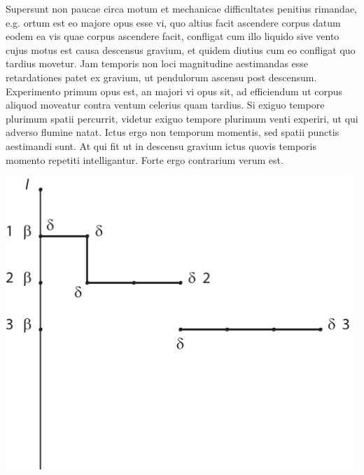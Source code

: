 \pend
\pstart
\noindent
Supersunt non paucae circa motum et mechanicae difficultates penitius rimandae,
e.g. ortum est eo majore opus esse vi\protect{},
quo altius facit ascendere corpus datum eodem
ea vis quae corpus ascendere facit,
confligat cum illo liquido sive vento cujus motus est causa descensus gravium\protect{},
et quidem diutius cum eo confligat quo tardius movetur.
Jam temporis non loci magnitudine aestimandas esse retardationes patet ex gravium,
ut pendulorum\protect{} ascensu post descensum.
\pend
\pstart
Experimento primum opus est, an majori vi opus sit, ad efficiendum ut corpus aliquod moveatur contra ventum celerius quam tardius.
Si exiguo tempore plurimum spatii percurrit, videtur exiguo tempore plurimum venti experiri, ut qui adverso flumine natat.
Ictus\protect{} ergo non temporum momentis, sed spatii punctis aestimandi sunt.
At qui fit ut in descensu gravium ictus quovis temporis momento repetiti intelligantur.
Forte ergo contrarium verum est.
\pend
\pstart
 \noindent
\begin{minipage}[t]{0.53\textwidth}
\includegraphics[trim = 0mm -5mm 0mm 0mm, clip, width=0.98\textwidth]{images/lh0350911_007v-d1.pdf}
\end{minipage}
\hspace*{13,3mm}
